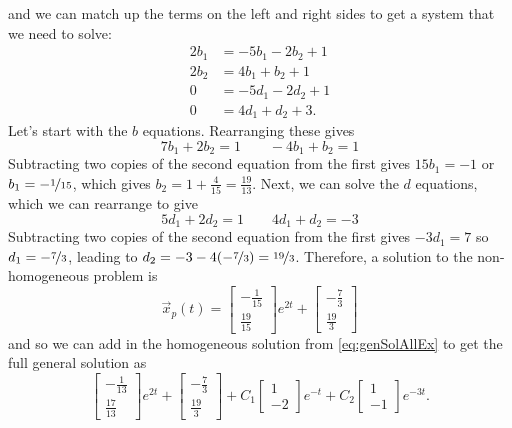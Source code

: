 \begin{exampleSol}
\begin{enumerate}[1.]
\begin{equation*}
\end{equation*}
and we can match up the terms on the left and right sides to get a system that we need to solve:
\begin{equation*}
\begin{split}
2b_1 &= -5b_1 - 2b_2 + 1 \\
2b_2 &= 4b_1 + b_2 + 1 \\
0 &= -5d_1- 2d_2 + 1 \\
0 &= 4d_1 + d_2 + 3.
\end{split}
\end{equation*}
Let's start with the $b$ equations. Rearranging these gives
\begin{equation*}
7b_1 + 2b_2 = 1 \qquad -4b_1 + b_2 = 1
\end{equation*}
Subtracting two copies of the second equation from the first gives $15b_1 = -1$ or $b_1 = -\nicefrac{1}{15}$, which gives $b_2 = 1 + \frac{4}{15} = \frac{19}{13}$. Next, we can solve the $d$ equations, which we can rearrange to give
\begin{equation*}
5d_1 + 2d_2 = 1 \qquad 4d_1 + d_2 = -3
\end{equation*} 
Subtracting two copies of the second equation from the first gives $-3d_1 = 7$ so $d_1 = -\nicefrac{7}{3}$, leading to $d_2 = -3 - 4(-\nicefrac{7}{3}) = \nicefrac{19}{3}$. Therefore, a solution to the non-homogeneous problem is
\begin{equation*}
\vec{x}_p(t) = \begin{bmatrix} -\frac{1}{15} \\ \frac{19}{15} \end{bmatrix} e^{2t} + \begin{bmatrix} -\frac{7}{3} \\ \frac{19}{3} \end{bmatrix}
\end{equation*}
and so we can add in the homogeneous solution from \eqref{eq:genSolAllEx} to get the full general solution as
\begin{equation} \label{eq:AllExUC}
\begin{bmatrix} -\frac{1}{13} \\ \frac{17}{13} \end{bmatrix} e^{2t} + \begin{bmatrix} -\frac{7}{3} \\ \frac{19}{3} \end{bmatrix} + C_1\begin{bmatrix} 1 \\ -2 \end{bmatrix}e^{-t} + C_2\begin{bmatrix} 1 \\ -1 \end{bmatrix}e^{-3t}.

\end{equation}
\end{enumerate}
\end{exampleSol}
